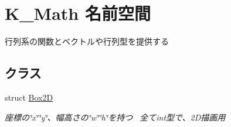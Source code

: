 \hypertarget{namespace_k___math}{}\section{K\+\_\+\+Math 名前空間}
\label{namespace_k___math}


行列系の関数とベクトルや行列型を提供する  


\subsection*{クラス}
\begin{DoxyCompactItemize}
\item 
struct \mbox{\hyperlink{struct_k___math_1_1_box2_d}{Box2D}}
\begin{DoxyCompactList}\small\item\em 座標の\char`\"{}x\char`\"{}\char`\"{}y\char`\"{}、幅高さの\char`\"{}w\char`\"{}\char`\"{}h\char`\"{}を持つ~\newline
全てint型で、2\+D描画用 \end{DoxyCompactList}\end{DoxyCompactItemize}
